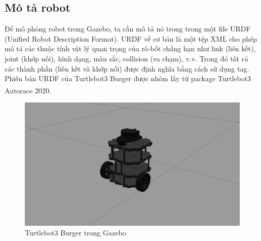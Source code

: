 \subsection{Mô tả robot}
\tab Để mô phỏng robot trong Gazebo, ta cần mô tả nó trong trong một file URDF (Unified Robot Description Format). URDF về cơ bản là một tệp XML cho phép mô tả các thuộc tính vật lý quan trọng của rô-bốt chẳng hạn như link (liên kết), joint (khớp nối), hình dạng, màu sắc, collision (va chạm), v.v. Trong đó tất cả các thành phần (liên kết và khớp nối) được định nghĩa bằng cách sử dụng tag.  Phiên bản URDF của Turtlebot3 Burger được nhóm lấy từ package Turtlebot3 Autorace 2020\textsuperscript{\cite{autorace}}.
\begin{figure}[!htb]
\begin{center}
    \includegraphics[width=12cm]{img/2_Theory/turtlebot3_burger_gazebo.png}
    \caption{Turtlebot3 Burger trong Gazebo}
\end{center}
\end{figure}
